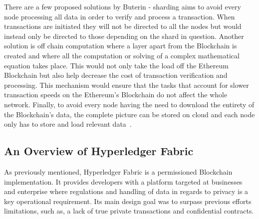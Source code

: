  There are a few proposed solutions by Buterin - sharding aims to avoid every node processing all data in order to verify and process a transaction. When transactions are initiated they will not be directed to all the nodes but would instead only be directed to those depending on the shard in question. Another solution is off chain computation where a layer apart from the Blockchain is created and where all the computation or solving of a complex mathematical equation takes place. This would not only take the load off the Ethereum Blockchain but also help decrease the cost of transaction verification and processing. This mechanism would ensure that the tasks that account for slower transaction speeds on the Ethereum’s Blockchain do not affect the whole network. Finally, to avoid every node having the need to download the entirety of the Blockchain's data, the complete picture can be stored on cloud and each node only has to store and load relevant data~\cite{ethereumBlogScalability2018}.

\subsection{An Overview of Hyperledger Fabric}

As previously mentioned, Hyperledger Fabric is a permissioned Blockchain implementation. It provides developers with a platform targeted at businesses and enterprise where regulations and handling of data in regards to privacy is a key operational requirement. Its main design
goal was to surpass previous efforts limitations, such as, a
lack of true private transactions and confidential contracts.

